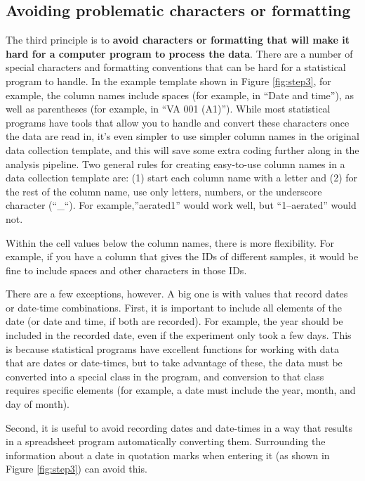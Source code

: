 \documentclass[]{tufte-book}
\begin{document}
\subsection{Avoiding problematic characters or formatting}\label{avoiding-problematic-characters-or-formatting}

The third principle is to \textbf{avoid characters or formatting that will make it
hard for a computer program to process the data}. There are a number of special
characters and formatting conventions that can be hard for a statistical program to
handle. In the example template shown in Figure \ref{fig:step3}, for example,
the column names include spaces (for example, in ``Date and time''), as well as
parentheses (for example, in ``VA 001 (A1)''). While most statistical programs have
tools that allow you to handle and convert these characters once the data are
read in, it's even simpler to use simpler column names in the original data collection
template, and this will save some extra coding further along in the analysis pipeline.
Two general rules for creating easy-to-use column names in a data collection template
are: (1) start each column name with a letter and (2) for the rest of the column
name, use only letters, numbers, or the underscore character (``\_``). For example,''aerated1'' would work well, but ``1--aerated'' would not.

Within the cell values below the column names, there is more flexibility. For example,
if you have a column that gives the IDs of different samples, it would be fine to include
spaces and other characters in those IDs.

There are a few exceptions, however. A big one
is with values that record dates or date-time combinations. First, it is important to include
all elements of the date (or date and time, if both are recorded). For example, the year
should be included in the recorded date, even if the experiment only took a few days.
This is because statistical programs have excellent functions for working with data that
are dates or date-times, but to take advantage of these, the data must be converted into
a special class in the program, and conversion to that class requires specific elements
(for example, a date must include the year, month, and day of month).

Second, it is
useful to avoid recording dates and date-times in a way that results in a spreadsheet
program automatically converting them. Surrounding the information about a date in
quotation marks when entering it (as shown in Figure \ref{fig:step3}) can avoid this.
\end{document}
